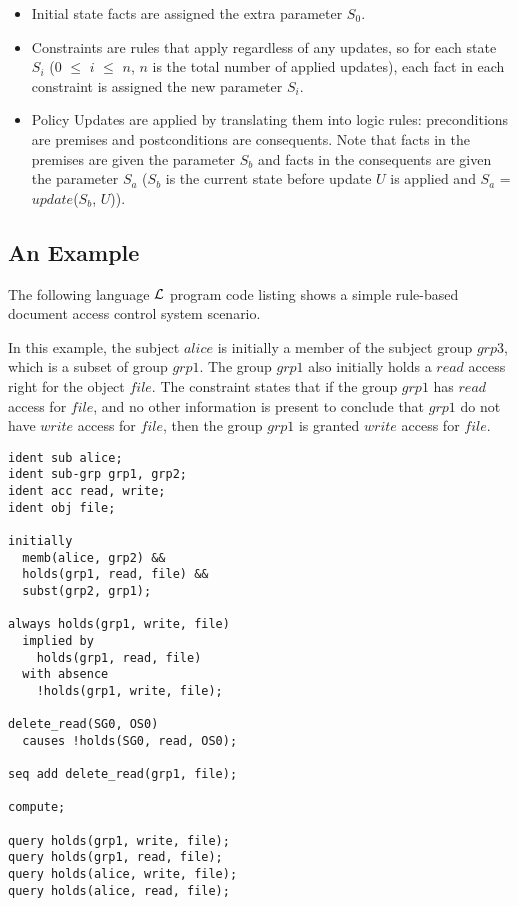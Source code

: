 \documentclass[11pt]{llncs}
\begin{document}
      \begin{itemize}
        \item
          Initial state facts are assigned the extra parameter $S_{0}$.
        \vspace{1mm}
        \item
          Constraints are rules that apply regardless of any updates, so
          for each state $S_{i}$ ($0$ $\leq$ $i$ $\leq$ $n$, $n$ is the total
          number of applied updates), each fact in each constraint is assigned
          the new parameter $S_{i}$.
        \vspace{1mm}
        \item
          Policy Updates are applied by translating them into logic rules:
          preconditions are premises and postconditions are consequents. Note
          that facts in the premises are given the parameter $S_{b}$ and
          facts in the consequents are given the parameter $S_{a}$ ($S_{b}$ is
          the current state before update $U$ is applied and $S_{a}$ =
          $update$($S_{b}$, $U$)).
      \end{itemize}

    \subsection{An Example}

      The following language ${\cal L}$ program code listing shows a simple
      rule-based document access control system scenario.

      In this example, the subject $alice$ is initially a member of the
      subject group $grp3$, which is a subset of group $grp1$. The group
      $grp1$ also initially holds a $read$ access right for the object $file$.
      The constraint states that if the group $grp1$ has $read$ access for
      $file$, and no other information is present to conclude that $grp1$
      do not have $write$ access for $file$, then the group $grp1$ is granted
      $write$ access for $file$.

      \begin{verbatim}ident sub alice;
ident sub-grp grp1, grp2;
ident acc read, write;
ident obj file;

initially
  memb(alice, grp2) &&
  holds(grp1, read, file) &&
  subst(grp2, grp1);

always holds(grp1, write, file)
  implied by
    holds(grp1, read, file)
  with absence
    !holds(grp1, write, file);

delete_read(SG0, OS0)
  causes !holds(SG0, read, OS0);

seq add delete_read(grp1, file);

compute;

query holds(grp1, write, file);
query holds(grp1, read, file);
query holds(alice, write, file);
query holds(alice, read, file);\end{verbatim}
\end{document}
